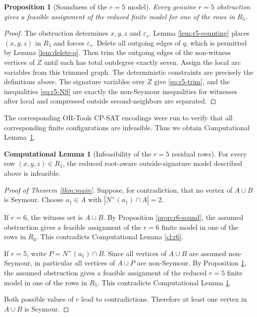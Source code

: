 \documentclass[a4paper,fleqn]{cas-sc}
\newtheorem{proposition}[theorem]{Proposition}
\theoremstyle{definition}
\newtheorem{computationallemma}{Computational Lemma}
\newcommand{\arp}[1]{\textcolor{red}{ArP: #1}}
\begin{document}
\begin{proposition}[Soundness of the $r=5$ model]\label{prop:r5-sound}
Every genuine $r=5$ obstruction gives a feasible assignment of the reduced finite model for one of the rows in $R_5$.
\end{proposition}
\begin{proof}
The obstruction determines $x,y,z$ and $\varepsilon_s$. Lemma \ref{lem:r5-counting} places $(x,y,z)$ in $R_5$ and forces $\varepsilon_s$.  Delete all outgoing edges of $q$, which is permitted by Lemma \ref{lem:delete-q}.  Then trim the outgoing edges of the non-witness vertices of $Z$ until each has total outdegree exactly seven.  Assign the local arc variables from this trimmed graph.  The deterministic constraints are precisely the definitions above.  The signature variables over $Z$ give \eqref{eq:r5-trim}, and the inequalities \eqref{eq:r5-NS} are exactly the non-Seymour inequalities for witnesses after local and compressed outside second-neighbors are separated.
\end{proof}

The corresponding OR-Tools CP-SAT encodings were run to verify that all corresponding finite configurations are infeasible.
Thus we obtain Computational Lemma~\ref{cl:r5}.
\begin{computationallemma}[Infeasibility of the $r=5$ residual rows]\label{cl:r5}
For every row $(x,y,z)\in R_5$, the reduced root-aware outside-signature model described above is infeasible.
\end{computationallemma}




\begin{proof}[Proof of Theorem \ref{thm:main}]
Suppose, for contradiction, that no vertex of $A\cup B$ is Seymour.  Choose $a_1\in A$ with $|N^+(a_1)\cap A|=2$.

If $r=6$, the witness set is $A\cup B$.  By Proposition \ref{prop:r6-sound}, the assumed obstruction gives a feasible assignment of the $r=6$ finite model in one of the rows in $R_6$.  This contradicts Computational Lemma \ref{cl:r6}.

If $r=5$, write $P=N^+(a_1)\cap B$.  Since all vertices of $A\cup B$ are assumed non-Seymour, in particular all vertices of $A\cup P$ are non-Seymour.  By Proposition \ref{prop:r5-sound}, the assumed obstruction gives a feasible assignment of the reduced $r=5$ finite model in one of the rows in $R_5$.  This contradicts Computational Lemma \ref{cl:r5}.

Both possible values of $r$ lead to contradictions. Therefore at least one vertex in $A\cup B$ is Seymour.

\end{proof}
\end{document}
